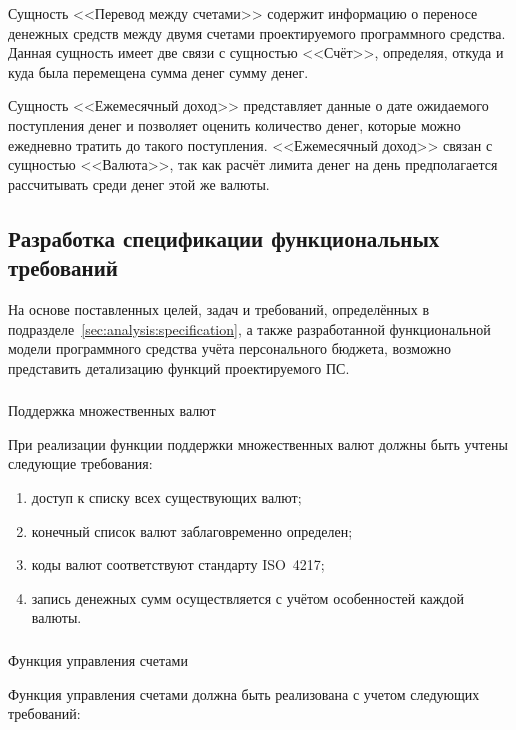 Сущность <<Перевод между счетами>> содержит информацию о переносе денежных средств между двумя счетами проектируемого программного средства.
Данная сущность имеет две связи с сущностью <<Счёт>>, определяя, откуда и куда была перемещена сумма денег сумму денег.

Сущность <<Ежемесячный доход>> представляет данные о дате ожидаемого поступления денег и позволяет оценить количество денег, которые можно ежедневно тратить до такого поступления.
<<Ежемесячный доход>> связан с сущностью <<Валюта>>, так как расчёт лимита денег на день предполагается рассчитывать среди денег этой же валюты.

\subsection{Разработка спецификации функциональных требований}
\label{sec:domain:specification}

На основе поставленных целей, задач и требований, определённых в подразделе~\ref{sec:analysis:specification}, а также разработанной функциональной модели программного средства учёта персонального бюджета, возможно представить детализацию функций проектируемого ПС.

\subsubsection{} Поддержка множественных валют
\label{sec:domain:specification:currencies}

При реализации функции поддержки множественных валют должны быть учтены следующие требования:

\begin{enumerate}
    \item доступ к списку всех существующих валют;
    \item конечный список валют заблаговременно определен;
    \item коды валют соответствуют стандарту ISO~4217;
    \item запись денежных сумм осуществляется с учётом особенностей каждой валюты.
\end{enumerate}


\subsubsection{} Функция управления счетами
\label{sec:domain:specification:wallets}

Функция управления счетами должна быть реализована с учетом следующих требований:

